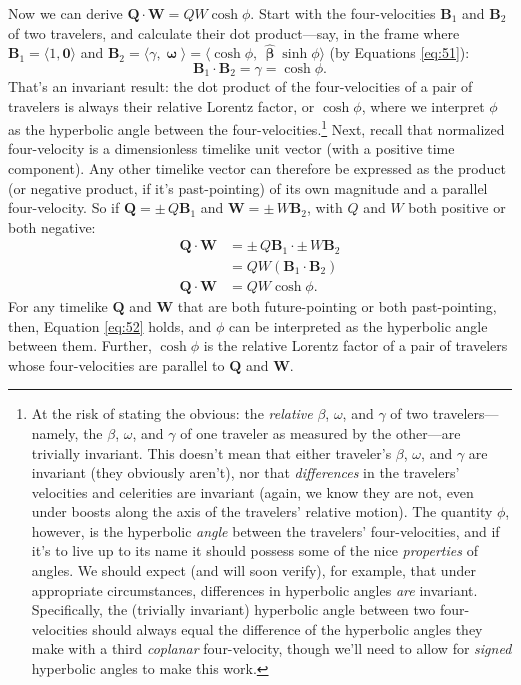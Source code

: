 \documentclass[12pt]{article}
\renewcommand{\vv}[1]{\mathbf{#1}}
\newcommand{\hatbeta}{\bm{\hat{\upbeta}}}
\newcommand{\vvomega}{\bm{\upomega}}
\begin{document}
Now we can derive $\vv Q \cdot \vv W = QW \cosh \phi$. Start with the four-velocities $\vv B_1$ and $\vv B_2$ of two travelers, and calculate their dot product---say, in the frame where $\vv B_1 = \langle 1, \vv 0 \rangle$ and $\vv B_2 = \langle \gamma, \vvomega \rangle = \langle \cosh{\phi}, \, \hatbeta \sinh{\phi} \rangle$ (by Equations \ref{eq:51}):
\begin{equation*}
\vv B_1 \cdot \vv B_2 = \gamma = \cosh{\phi}.
\end{equation*}
That's an invariant result: the dot product of the four-velocities of a pair of travelers is always their relative Lorentz factor, or $\cosh{\phi}$, where we interpret $\phi$ as the hyperbolic angle between the four-velocities.\footnote{\label{fn:ha}At the risk of stating the obvious: the \emph{relative} $\beta$, $\omega$, and $\gamma$ of two travelers---namely, the $\beta$, $\omega$, and $\gamma$ of one traveler as measured by the other---are trivially invariant. This doesn't mean that either traveler's $\beta$, $\omega$, and $\gamma$ are invariant (they obviously aren't), nor that \emph{differences} in the travelers' velocities and celerities are invariant (again, we know they are not, even under boosts along the axis of the travelers' relative motion). The quantity $\phi$, however, is the hyperbolic \emph{angle} between the travelers' four-velocities, and if it's to live up to its name it should possess some of the nice \emph{properties} of angles. We should expect (and will soon verify), for example, that under appropriate circumstances, differences in hyperbolic angles \emph{are} invariant. Specifically, the (trivially invariant) hyperbolic angle between two four-velocities should always equal the difference of the hyperbolic angles they make with a third \emph{coplanar} four-velocity, though we'll need to allow for \emph{signed} hyperbolic angles to make this work.} Next, recall that normalized four-velocity is a dimensionless timelike unit vector (with a positive time component). Any other timelike vector can therefore be expressed as the product (or negative product, if it's past-pointing) of its own magnitude and a parallel four-velocity. So if $\vv Q = \pm \, Q \vv B_1$ and $\vv W = \pm \, W \vv B_2$, with $Q$ and $W$ both positive or both negative:
\begin{equation}\label{eq:52}
\begin{split}
\vv Q \cdot \vv W &= \pm \, Q \vv B_1 \cdot \pm \, W \vv B_2 \\
&= QW (\vv B_1 \cdot \vv B_2) \\
\vv Q \cdot \vv W &= QW \cosh{\phi}.
\end{split}
\end{equation}
For any timelike $\vv Q$ and $\vv W$ that are both future-pointing or both past-pointing, then, Equation \ref{eq:52} holds, and $\phi$ can be interpreted as the hyperbolic angle between them. Further, $\cosh{\phi}$ is the relative Lorentz factor of a pair of travelers whose four-velocities are parallel to $\vv Q$ and $\vv W$.
\end{document}
